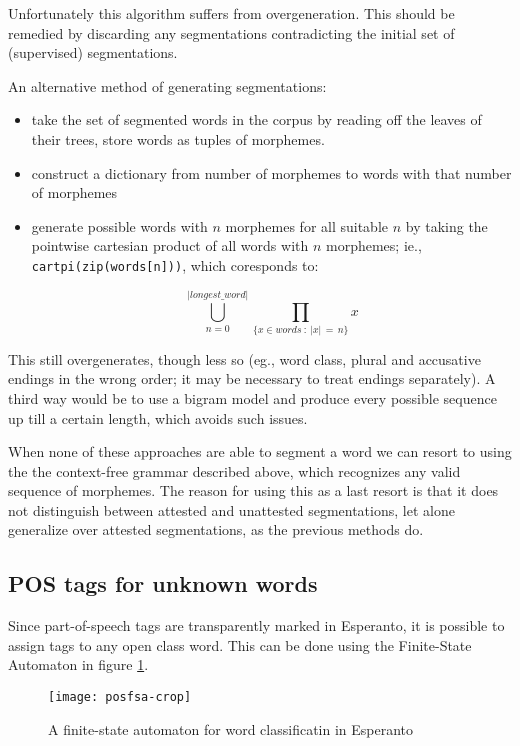 \documentclass[10pt,a4paper]{article}
\begin{document}
Unfortunately this algorithm suffers from overgeneration. This should be
remedied by discarding any segmentations contradicting the initial set of
(supervised) segmentations. 

An alternative method of generating segmentations:

\begin{itemize}
\item take the set of segmented words in the corpus by reading off the leaves
of their trees, store words as tuples of morphemes.

\item construct a dictionary from number of morphemes to words with that number
of morphemes

\item generate possible words with $n$ morphemes for all suitable $n$ by taking
the pointwise cartesian product of all words with $n$ morphemes; ie.,
\texttt{cartpi(zip(words[n]))}, which coresponds to:

\[ \displaystyle\bigcup_{n=0}^{\vert longest\_word\vert}\prod_{\{x \in words \: : \: \vert x\vert \, = \, n\}} x \]


\end{itemize}

This still overgenerates, though less so (eg., word class, plural and
accusative endings in the wrong order; it may be necessary to treat endings
separately). A third way would be to use a bigram model and produce every
possible sequence up till a certain length, which avoids such issues.

When none of these approaches are able to segment a word we can resort to
using the the context-free grammar described above, which recognizes any valid
sequence of morphemes. The reason for using this as a last resort is that it
does not distinguish between attested and unattested segmentations, let alone
generalize over attested segmentations, as the previous methods do.

\subsection{POS tags for unknown words}

Since part-of-speech tags are transparently marked in Esperanto, it is
possible to assign tags to any open class word. This can be done using the
Finite-State Automaton in figure \ref{posfsa}.

\begin{figure}
\centering
\texttt{[image: posfsa-crop]}
\caption{A finite-state automaton for word classificatin in Esperanto}
\label{posfsa}
\end{figure}
\end{document}
